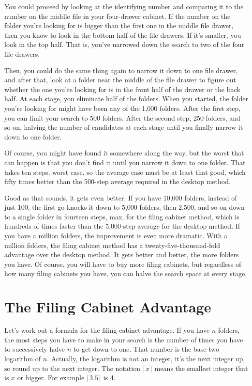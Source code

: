 You could proceed by looking at
the identifying number and comparing it to the number on the middle
file in your four-drawer cabinet.
If the number on the folder you're looking for is bigger than the first one in
the middle file drawer, then you know to look in the bottom half of the
file drawers. If it's smaller, you look in the top half.
That is, you've narrowed down the search to two of the four file drawers.

Then, you could do the same thing again to narrow it down to one file drawer,
and after that, look at a folder near the middle of the file drawer
to figure out whether the one you're looking for is in the front half
of the drawer or the back half.
At each stage, you eliminate half of the folders.
When you started, the folder you're looking for might have been any
of the 1,000 folders. After the first step, you can limit your search
to 500 folders. After the second step, 250 folders, and so on,
halving the number of candidates at each stage until you finally
narrow it down to one folder.

Of course, you might have found it somewhere along the way,
but the worst that can happen is that you don't find it until you
narrow it down to one folder. That takes ten steps, worst case, so
the average case must be at least that good, which
fifty times better than the 500-step average required in the desktop method.

Good as that sounds, it gets even better. If you have 10,000 folders,
instead of just 100, the first go knocks it down to 5,000 folders,
then 2,500, and so on down to a single folder in fourteen steps, max,
for the filing cabinet method, which is hundreds of times faster
than the 5,000-step average for the desktop method.
If you have a million
folders, the improvement is even more dramatic. With a million
folders, the filing cabinet method has a twenty-five-thousand-fold
advantage over the desktop method. It gets better and better, the
more folders you have. Of course, you will have to buy more filing
cabinets, but regardless of how many filing cabinets you have,
you can halve the search space at every stage.

\section{The Filing Cabinet Advantage}

Let's work out a formula for the filing-cabinet advantage. If you
have $n$ folders, the most steps you have to make in your search is
the number of times you have to successively halve $n$ to get down
to one. That number is the base-two logarithm of $n$. Actually,
the logarithm is not an integer, it's the next integer up, so
round up to the next integer.
The notation $\lceil x \rceil$ means the smallest integer that is
$x$ or bigger.
For example $\lceil 3.5 \rceil$ is 4.

